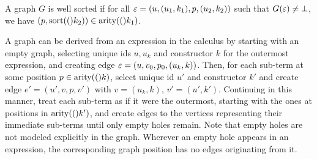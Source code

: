 A graph $G$ is well sorted if
for all $\varepsilon = (u, (u_1, k_1), p, (u_2, k_2))$
such that $G(\varepsilon) \neq \bot$,
we have $(p, \operatorname{\text{sort}}\mathopen{}\left((\right)\mathclose{}k_2)) \in \operatorname{\text{arity}}\mathopen{}\left((\right)\mathclose{}k_1)$.





\vspace*{\baselineskip}

A graph can be derived from an expression in the calculus by starting with an
empty graph, selecting unique ids $u, u_k$ and constructor $k$ for the outermost
expression, and creating edge $\varepsilon = (u, v_0, p_0, (u_k, k))$. Then, for each
sub-term at some position $p \in \operatorname{\text{arity}}\mathopen{}\left((\right)\mathclose{}k)$, select unique id $u'$ and
constructor $k'$ and create edge $e' = (u', v, p, v')$ with $v = (u_k, k)$, $v'
= (u', k')$. Continuing in this manner, treat each sub-term as if it were the
outermost, starting with the ones at positions in $\operatorname{\text{arity}}\mathopen{}\left((\right)\mathclose{}k')$, and create edges
to the vertices representing their immediate sub-terms until only empty holes
remain. Note that empty holes are not modeled explicitly in the graph. Wherever
an empty hole appears in an expression, the corresponding graph position has no
edges originating from it.


